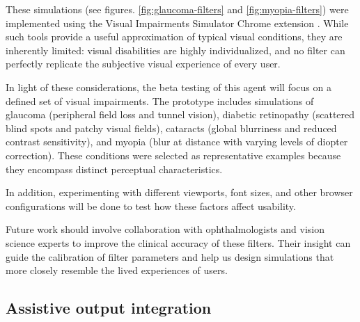 These simulations (see figures. \ref{fig:glaucoma-filters} and \ref{fig:myopia-filters}) were implemented using the Visual Impairments Simulator Chrome extension \cite{visual_impairments_simulator}. While such tools provide a useful approximation of typical visual conditions, they are inherently limited: visual disabilities are highly individualized, and no filter can perfectly replicate the subjective visual experience of every user.


In light of these considerations, the beta testing of this agent will focus on a defined set of visual impairments. The prototype includes simulations of glaucoma (peripheral field loss and tunnel vision\cite{Cassel2021EyeBook}), diabetic retinopathy (scattered blind spots and patchy visual fields\cite{Cassel2021EyeBook}), cataracts (global blurriness and reduced contrast sensitivity\cite{Cassel2021EyeBook}), and myopia (blur at distance with varying levels of diopter correction\cite{Cassel2021EyeBook}). These conditions were selected as representative examples because they encompass distinct perceptual characteristics.

In addition, experimenting with different viewports, font sizes, and other browser configurations\cite{chiou2024automatically} will be done to test how these factors affect usability.


Future work should involve collaboration with ophthalmologists and vision science experts to improve the clinical accuracy of these filters. Their insight can guide the calibration of filter parameters and help us design simulations that more closely resemble the lived experiences of users.

\subsection{Assistive output integration}

